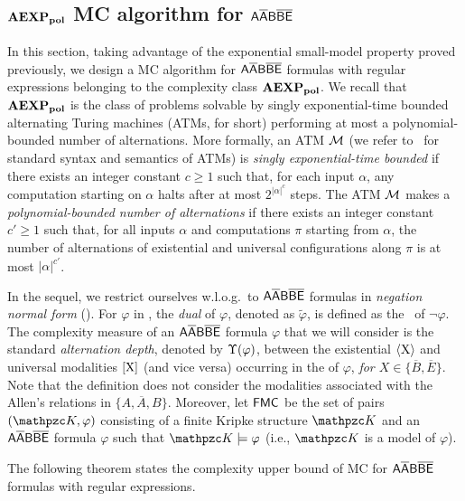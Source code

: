 \subsection{$\mathbf{AEXP_{pol}}$ MC algorithm for $\mathsf{A\overline{A}B\overline{B}\overline{E}}$}\label{sec:UpperBound}

In this section, taking advantage of the  exponential small-model property proved previously, we design a MC algorithm for $\mathsf{A\overline{A}B\overline{B}\overline{E}}$ formulas with regular expressions belonging to the complexity class $\mathbf{AEXP_{pol}}$.
We recall that  $\mathbf{AEXP_{pol}}$ is the class of problems solvable by  singly exponential-time bounded alternating Turing machines (ATMs, for short) performing at most a polynomial-bounded number of alternations. More formally, an ATM ${\mathcal{M}}$ (we refer to~\cite{CKS81} for standard syntax and semantics of ATMs)  is \emph{singly exponential-time bounded} if there exists an integer constant $c\geq 1$ such that, for each input $\alpha$, any computation starting on  $\alpha$
 halts after at most $2^{|\alpha|^{c}}$ steps. The ATM ${\mathcal{M}}$ makes a \emph{polynomial-bounded number of alternations} if there exists an integer constant $c'\geq 1$ such that, for all inputs $\alpha$ and computations $\pi$ starting from $\alpha$, the number of alternations of existential and universal configurations along $\pi$ is at most $|\alpha|^{c'}$.

In the sequel, we restrict ourselves w.l.o.g.\ to
$\mathsf{A\overline{A}B\overline{B}\overline{E}}$  formulas in
\emph{negation normal form} (\nnf). 
 For $\varphi$ in \nnf, the \emph{dual}
 of  $\varphi$, denoted as $\widetilde{\varphi}$, is defined as  the \nnf\ of $\neg\varphi$.
%
The complexity measure of an $\mathsf{A\overline{A}B\overline{B}\overline{E}}$ formula $\varphi$ that we will consider is
the standard  \emph{alternation depth}, denoted by $\Upsilon(\varphi)$, between the existential $\operatorname{\langle X\rangle}$  and universal
modalities $\operatorname{\mathopen[ X \mathclose]}$ (and vice versa) occurring in the \nnf{} of $\varphi$, \emph{for $X\in \{\overline{B},\overline{E}\}$}. Note that the definition does not consider the modalities associated with the Allen's relations in $\{A,\overline{A},B\}$. 
Moreover, let $\mathsf{FMC}$ be the set of pairs $(\Ku,\varphi)$ consisting of a finite Kripke structure $\Ku$ and an $\mathsf{A\overline{A}B\overline{B}\overline{E}}$ formula $\varphi$ such that $\Ku\models\varphi$ (i.e., $\Ku$ is a model of $\varphi$). 

The following theorem states the complexity upper bound of MC for $\mathsf{A\overline{A}B\overline{B}\overline{E}}$ formulas with regular expressions.



